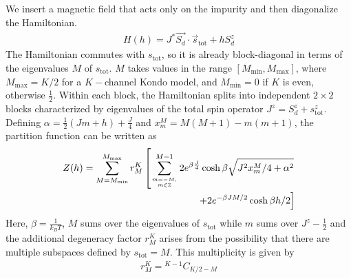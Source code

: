 \documentclass[reprint,prb,superscriptaddress]{revtex4-2}
\begin{document}
We insert a magnetic field that acts only on the impurity and then diagonalize the Hamiltonian.
\begin{align}
	\label{stargraph_field_hamiltonian}
	H(h) = J^* \vec{S_d}\cdot\vec{s}_\text{tot} + h S_d^z
\end{align}
The Hamiltonian commutes with \(s_\text{tot}\), so it is already block-diagonal in terms of the eigenvalues \(M\) of \(s_\text{tot}\). \(M\) takes values in the range \(\left[M_\text{min}, M_\text{max}\right]\), where \(M_\text{max} = K/2\) for a \(K-\)channel Kondo model, and \(M_\text{min} = 0\)  if \(K\) is even, otherwise \(\frac{1}{2}\). Within each block, the Hamiltonian splits into independent \(2\times 2\) blocks characterized by eigenvalues of the total spin operator \(J^z = S_d^z + s^z_\text{tot}\). Defining \(\alpha = \frac{1}{2}\left(Jm + h\right) + \frac{J}{4}\) and \(x^M_m = M(M+1) - m(m+1)\), the partition function can be written as
\begin{align}
	Z(h) =\sum_{M=M_\text{min}}^{M_\text{max}}r^K_M\left[\sum_{m=-M, \atop{m\in \mathbb{Z}}}^{M-1}2e^{\beta \frac{J}{4}}\cosh \beta\sqrt{J^2x^M_m/4 + \alpha^2} \right.\nonumber\\
\left.+ 2e^{-\beta JM/2}\cosh \beta h/2\right]
\end{align}
Here, \(\beta = \frac{1}{k_B T}\), \(M\) sums over the eigenvalues of \(s_\text{tot}\) while \(m\) sums over \(J^z - \frac{1}{2}\) and the additional degeneracy factor \(r^K_M\) arises from the possibility that there are multiple subspaces defined by \(s_\text{tot}=M\). This multiplicity is given by
\begin{align}
	\label{extra_degen}
	r^K_M = {}^{K-1}C_{K/2 - M}
\end{align}
\end{document}

